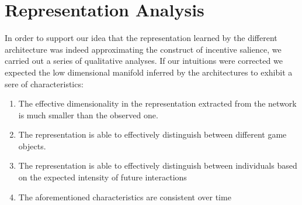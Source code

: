 \section{Representation Analysis}
\label{representation_analysis}
In order to support our idea that the representation learned by the different architecture was indeed approximating the construct of incentive salience, we carried out a series of qualitative analyses. If our intuitions were corrected we expected the low dimensional manifold inferred by the architectures to exhibit a sere of characteristics:
\begin{enumerate}
    \item The effective dimensionality in the representation extracted from the network is much smaller than the observed one.
    \item The representation is able to effectively distinguish between different game objects.
    \item The representation is able to effectively distinguish between individuals based on the expected intensity of future interactions
    \item The aforementioned characteristics are consistent over time
\end{enumerate}
